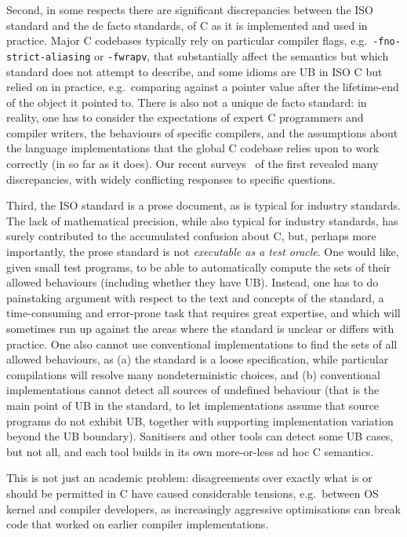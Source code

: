 \documentclass[acmsmall,review,screen]{acmart}\settopmatter{printfolios=true,printccs=false,printacmref=false}
\begin{document}
Second, in some respects there are significant discrepancies between
the ISO standard and the de facto standards, of C as it is implemented
and used in practice.  
Major C codebases typically rely on particular
compiler flags, e.g.~\texttt{-fno-strict-aliasing} or
\texttt{-fwrapv}, that substantially affect the semantics but which
standard does not attempt to describe, and 
some idioms are UB in ISO C but
relied on in practice, e.g.~comparing against a pointer value after 
the lifetime-end of the object it pointed to.
%
There is also not a unique de facto standard: in reality, one has
to consider
the expectations of expert C programmers and compiler writers,
the behaviours of specific compilers,
and 
the assumptions about the language implementations that the global C
   codebase relies upon to work correctly (in so far as it does). 
%
Our recent surveys~\cite{Cerberus-PLDI16,N2015} of the first revealed many
discrepancies, with widely conflicting responses to specific questions.

Third, the ISO standard is a prose document, as is typical for
industry standards. The lack of mathematical precision, while also
typical for
industry standards, has surely
contributed to the accumulated confusion about C, but, perhaps more
importantly, the prose standard is not \emph{executable as a
  test oracle}.  One would like, given small test programs, to be able
to automatically compute the sets of their allowed behaviours
(including whether they have UB).  Instead, one has
to do painstaking argument with respect to the text and concepts of
the standard, a time-consuming and error-prone task that requires
great expertise, and which will sometimes run up against the areas
where the standard is unclear or differs with practice. 
%
One also cannot use conventional implementations to find the sets of
all allowed
behaviours, as (a) the standard is a loose specification, while
particular compilations will resolve many nondeterministic choices,
and (b) conventional implementations cannot detect all sources of
undefined behaviour
 (that is the main point of UB in the
standard, to let implementations assume that source programs do not
exhibit UB, together with supporting implementation variation
beyond the UB boundary).   Sanitisers and other tools can detect some UB cases,
but not all, and each tool builds in its own more-or-less ad hoc C semantics.
% 



This is not just an academic problem: disagreements over exactly what
is or should be permitted in C have caused considerable tensions,
e.g.~between OS kernel and compiler developers, as
increasingly aggressive optimisations can break code that worked on
earlier compiler implementations.
\end{document}
